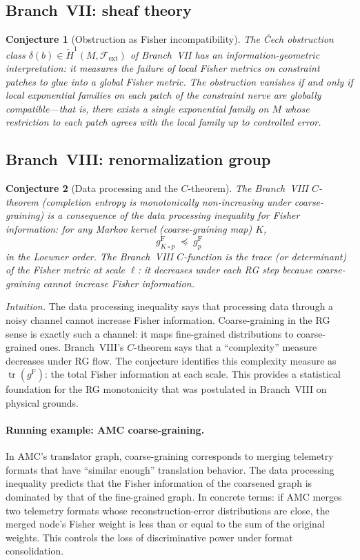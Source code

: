 \documentclass[11pt]{article}
\DeclareMathOperator{\tr}{tr}
\newcommand{\gF}{g^{\mathrm{F}}}
\newtheorem{conjecture}{Conjecture}
\theoremstyle{remark}
\begin{document}
\subsection{Branch~VII: sheaf theory}

\begin{conjecture}[Obstruction as Fisher incompatibility]
\label{conj:sheaf-fisher}
The \v{C}ech obstruction class
$\delta(b) \in \check{H}^1(M, \mathcal{F}_{\mathrm{ext}})$ of Branch~VII
has an information-geometric interpretation: it measures the failure of local
Fisher metrics on constraint patches to glue into a global Fisher metric.
The obstruction vanishes if and only if local exponential families on each
patch of the constraint nerve are globally compatible---that is, there exists
a single exponential family on $M$ whose restriction to each patch agrees
with the local family up to controlled error.
\end{conjecture}

\subsection{Branch~VIII: renormalization group}

\begin{conjecture}[Data processing and the $C$-theorem]
\label{conj:data-processing}
The Branch~VIII $C$-theorem (completion entropy is monotonically
non-increasing under coarse-graining) is a consequence of the
\emph{data processing inequality for Fisher information}: for any Markov
kernel (coarse-graining map) $K$,
\[
\gF_{K \circ p}
\;\preceq\;
\gF_p
\]
in the Loewner order.  The Branch~VIII $C$-function is the trace (or
determinant) of the Fisher metric at scale $\ell$: it decreases under
each RG step because coarse-graining cannot increase Fisher information.
\end{conjecture}

\noindent\emph{Intuition.}  The data processing inequality says that
processing data through a noisy channel cannot increase Fisher information.
Coarse-graining in the RG sense is exactly such a channel: it maps
fine-grained distributions to coarse-grained ones.  Branch~VIII's
$C$-theorem says that a ``complexity'' measure decreases under RG flow.
The conjecture identifies this complexity measure as $\tr(\gF)$: the total
Fisher information at each scale.  This provides a statistical foundation
for the RG monotonicity that was postulated in Branch~VIII on physical
grounds.

\paragraph{Running example: AMC coarse-graining.}
In AMC's translator graph, coarse-graining corresponds to merging telemetry
formats that have ``similar enough'' translation behavior.  The data
processing inequality predicts that the Fisher information of the coarsened
graph is dominated by that of the fine-grained graph.  In concrete terms:
if AMC merges two telemetry formats whose reconstruction-error distributions
are close, the merged node's Fisher weight is less than or equal to the sum
of the original weights.  This controls the loss of discriminative power
under format consolidation.
\end{document}
